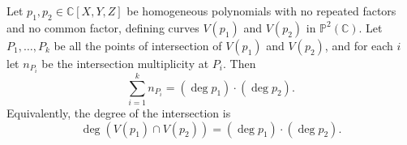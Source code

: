 Let $p_1, p_2 \in \mathbb{C}[X,Y,Z]$ be homogeneous polynomials with no repeated factors and no common factor, defining curves $V(p_1)$ and $V(p_2)$ in $\mathbb{P}^2(\mathbb{C})$. Let $P_1, \ldots, P_k$ be all the points of intersection of $V(p_1)$ and $V(p_2)$, and for each $i$ let $n_{P_i}$ be the intersection multiplicity at $P_i$. Then
$$\sum_{i=1}^{k} n_{P_i} = (\deg p_1) \cdot (\deg p_2).$$
Equivalently, the degree of the intersection is
$$\deg(V(p_1) \cap V(p_2)) = (\deg p_1) \cdot (\deg p_2).$$
